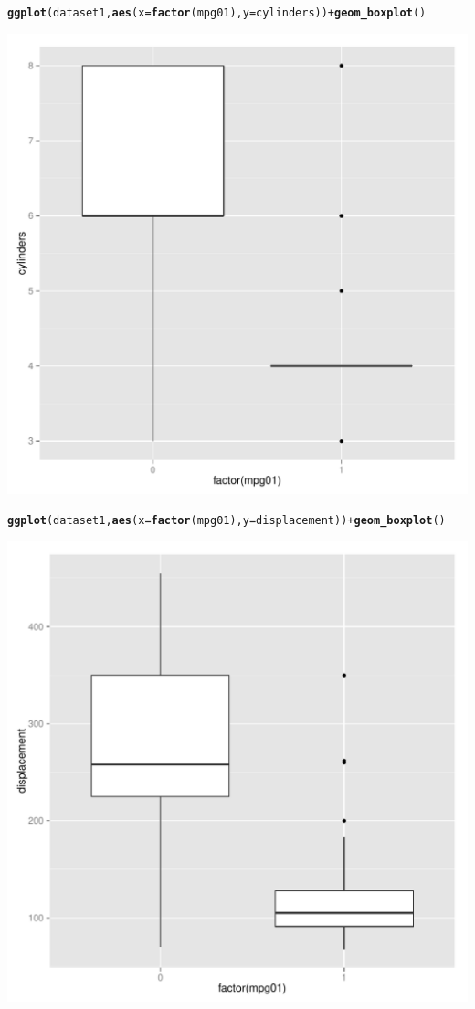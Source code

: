 \documentclass{article}\usepackage[]{graphicx}\usepackage[]{color}
\makeatletter
\def\maxwidth{ %
  \ifdim\Gin@nat@width>\linewidth
    \linewidth
  \else
    \Gin@nat@width
  \fi
}
\newcommand{\hlopt}[1]{\textcolor[rgb]{0,0,0}{#1}}%
\newcommand{\hlstd}[1]{\textcolor[rgb]{0.345,0.345,0.345}{#1}}%
\newcommand{\hlkwc}[1]{\textcolor[rgb]{0.333,0.667,0.333}{#1}}%
\newcommand{\hlkwd}[1]{\textcolor[rgb]{0.737,0.353,0.396}{\textbf{#1}}}%
\newenvironment{kframe}{%
 \def\at@end@of@kframe{}%
 \ifinner\ifhmode%
  \def\at@end@of@kframe{\end{minipage}}%
  \begin{minipage}{\columnwidth}%
 \fi\fi%
 \def\FrameCommand##1{\hskip\@totalleftmargin \hskip-\fboxsep
 \colorbox{shadecolor}{##1}\hskip-\fboxsep
     \hskip-\linewidth \hskip-\@totalleftmargin \hskip\columnwidth}%
 \MakeFramed {\advance\hsize-\width
   \@totalleftmargin\z@ \linewidth\hsize
   \@setminipage}}%
 {\par\unskip\endMakeFramed%
 \at@end@of@kframe}
\newenvironment{knitrout}{}{} %
\makeatother
\begin{document}
\begin{enumerate}[(a)]
\begin{knitrout}
\begin{kframe}\begin{alltt}
\hlkwd{ggplot}\hlstd{(dataset1,} \hlkwd{aes}\hlstd{(}\hlkwc{x}\hlstd{=}\hlkwd{factor}\hlstd{(mpg01),} \hlkwc{y}\hlstd{=cylinders))}\hlopt{+}\hlkwd{geom_boxplot}\hlstd{()}
\end{alltt}
\end{kframe}
\includegraphics[width=\maxwidth]{figure/unnamed-chunk-7-3} 
\begin{kframe}\begin{alltt}
\hlkwd{ggplot}\hlstd{(dataset1,} \hlkwd{aes}\hlstd{(}\hlkwc{x}\hlstd{=}\hlkwd{factor}\hlstd{(mpg01),} \hlkwc{y}\hlstd{=displacement))}\hlopt{+}\hlkwd{geom_boxplot}\hlstd{()}
\end{alltt}
\end{kframe}
\includegraphics[width=\maxwidth]{figure/unnamed-chunk-7-4} 

\end{knitrout}
\end{enumerate}
\end{document}
